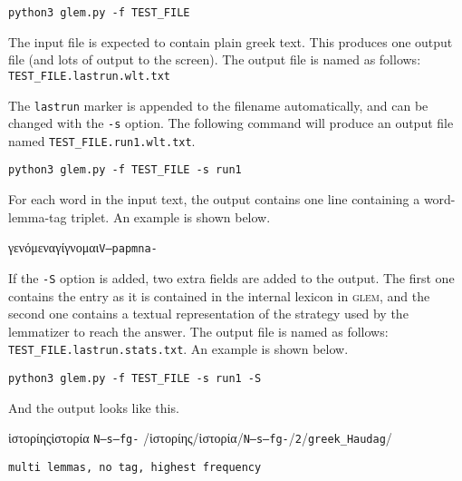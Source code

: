 \documentclass[a4paper]{article}
\def\glem{\textsc{glem}}
\begin{document}
\begin{tcolorbox}
\texttt{python3 glem.py -f TEST\_FILE}
\end{tcolorbox}

The input file is expected to contain plain greek text. This produces one output
file (and lots of output to the screen). The output file is named as follows:
\texttt{TEST\_FILE.lastrun.wlt.txt}

The \texttt{lastrun} marker is appended to the filename automatically, and can be changed with
the \texttt{-s} option. The following command will produce an output file
named \texttt{TEST\_FILE.run1.wlt.txt}.

\begin{tcolorbox}
\texttt{python3 glem.py -f TEST\_FILE -s run1}
\end{tcolorbox}

For each word in the input text, the output contains one line containing a
word-lemma-tag triplet. An example is shown below.

\begin{tcolorbox}
\textgreek{γενόμενα}\hspace{0.5cm}\textgreek{γίγνομαι}\hspace{0.5cm}\texttt{V--papmna-}
\end{tcolorbox}

If the \texttt{-S} option is added, two extra fields are added to the
output. The first one contains the entry as it is contained in the internal
lexicon in \glem{}, and the second one contains a textual representation of the
strategy used by the lemmatizer to reach the answer. The output file is named as
follows: \texttt{TEST\_FILE.lastrun.stats.txt}. An example is shown below.

\begin{tcolorbox}
\texttt{python3 glem.py -f TEST\_FILE -s run1 -S}
\end{tcolorbox}

And the output looks like this.

\begin{tcolorbox}
ἱστορίης\hspace{0.5cm}ἱστορία
\hspace{0.5cm}\texttt{N--s---fg-}\hspace{0.5cm}
/\textgreek{ἱστορίης}/\textgreek{ἱστορία}/\texttt{N--s---fg-}/\texttt{2}/\texttt{greek\_Haudag}/\\
\strut\hfill\texttt{multi lemmas, no tag, highest frequency}
\end{tcolorbox}
\end{document}
